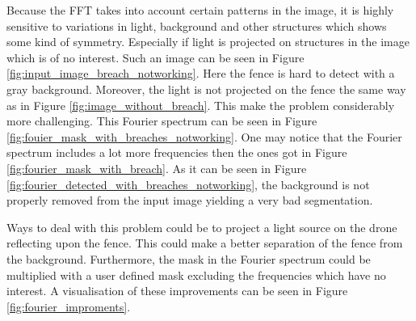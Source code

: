 \documentclass[../Head/Main.tex]{subfiles}
\begin{document}
Because the FFT takes into account certain patterns in the image, it is highly sensitive to variations in light, background and other structures which shows some kind of symmetry. Especially if light is projected on structures in the image which is of no interest. Such an image can be seen in Figure \ref{fig:input_image_breach_notworking}. Here the fence is hard to detect with a gray background. Moreover, the light is not projected on the fence the same way as in Figure \ref{fig:image_without_breach}. This make the problem considerably more challenging. This Fourier spectrum can be seen in Figure \ref{fig:fouier_mask_with_breaches_notworking}. One may notice that the Fourier spectrum includes a lot more frequencies then the ones got in Figure \ref{fig:fourier_mask_with_breach}. As it can be seen in Figure \ref{fig:fourier_detected_with_breaches_notworking}, the background is not properly removed from the input image yielding a very bad segmentation.

Ways to deal with this problem could be to project a light source on the drone reflecting upon the fence. This could make a better separation of the fence from the background. Furthermore, the mask in the Fourier spectrum could be multiplied with a user defined mask excluding the frequencies which have no interest. A visualisation of these improvements can be seen in Figure \ref{fig:fourier_improments}. 
\end{document}
